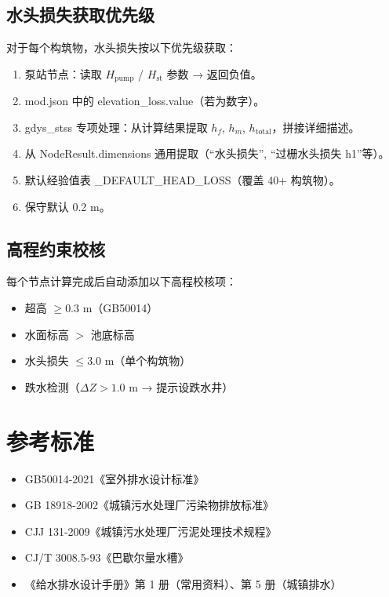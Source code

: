 \documentclass[12pt,a4paper]{ctexart}
\begin{document}
\subsection{水头损失获取优先级}

对于每个构筑物，水头损失按以下优先级获取：

\begin{enumerate}[label=优先级 \arabic*：, leftmargin=*]
    \item 泵站节点：读取 $H_{\text{pump}}$ / $H_{\text{st}}$ 参数 → 返回负值。
    \item mod.json 中的 elevation\_loss.value（若为数字）。
    \item gdys\_stss 专项处理：从计算结果提取 $h_f$, $h_m$, $h_{\text{total}}$，拼接详细描述。
    \item 从 NodeResult.dimensions 通用提取（``水头损失'', ``过栅水头损失 h1''等）。
    \item 默认经验值表 \_DEFAULT\_HEAD\_LOSS（覆盖 40+ 构筑物）。
    \item 保守默认 0.2 m。
\end{enumerate}

\subsection{高程约束校核}

每个节点计算完成后自动添加以下高程校核项：

\begin{itemize}[itemsep=0pt]
    \item 超高 $\geq 0.3$ m（GB50014）
    \item 水面标高 $>$ 池底标高
    \item 水头损失 $\leq 3.0$ m（单个构筑物）
    \item 跌水检测（$\Delta Z > 1.0$ m → 提示设跌水井）
\end{itemize}

\newpage

\section{参考标准}

\begin{itemize}[itemsep=0pt]
    \item GB50014-2021《室外排水设计标准》
    \item GB 18918-2002《城镇污水处理厂污染物排放标准》
    \item CJJ 131-2009《城镇污水处理厂污泥处理技术规程》
    \item CJ/T 3008.5-93《巴歇尔量水槽》
    \item 《给水排水设计手册》第 1 册（常用资料）、第 5 册（城镇排水）
\end{itemize}
\end{document}
